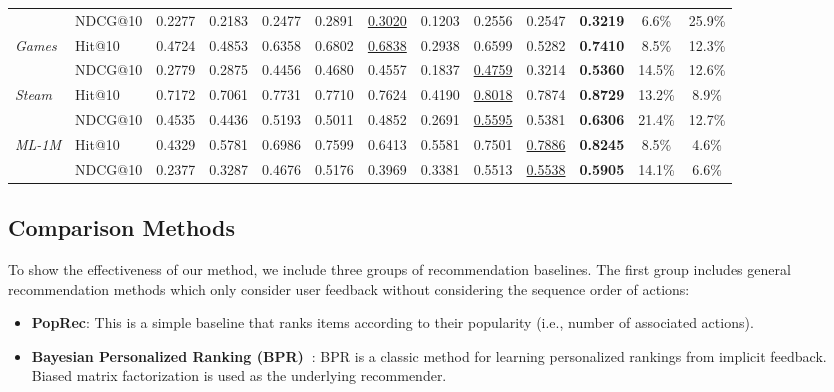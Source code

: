 \documentclass[conference]{IEEEtran}
\begin{document}
\begin{table*}
\begin{tabular}{llccccccccccc}
                                       	& NDCG@10 & 0.2277 & 0.2183 & 0.2477 & 0.2891 & \underline{0.3020} & 0.1203 & 0.2556 & 0.2547 & \textbf{0.3219} & 6.6\% & 25.9\% \\[1.5mm]
\multirow{2}{*}{\emph{Games}}     		& Hit@10  & 0.4724 & 0.4853 & 0.6358 & 0.6802 & \underline{0.6838} & 0.2938 & 0.6599 & 0.5282 & \textbf{0.7410} & 8.5\%	& 12.3\%  \\
                                        & NDCG@10 & 0.2779 & 0.2875 & 0.4456 & 0.4680 & 0.4557 & 0.1837 & \underline{0.4759} & 0.3214 & \textbf{0.5360} & 14.5\% & 12.6\% \\[1.5mm]
\multirow{2}{*}{\emph{Steam}}      		& Hit@10  & 0.7172 & 0.7061 & 0.7731 & 0.7710 & 0.7624 & 0.4190 & \underline{0.8018} & 0.7874 & \textbf{0.8729} & 13.2\% & 8.9\%\\
                                        & NDCG@10 & 0.4535 & 0.4436 & 0.5193 & 0.5011 & 0.4852 & 0.2691 & \underline{0.5595} & 0.5381 & \textbf{0.6306} & 21.4\% & 12.7\% \\[1.5mm]
\multirow{2}{*}{\emph{ML-1M}}    		& Hit@10  & 0.4329 & 0.5781 & 0.6986 & 0.7599 & 0.6413 & 0.5581 & 0.7501 & \underline{0.7886} & \textbf{0.8245} & 8.5\% & 4.6\%\\
                                        & NDCG@10 & 0.2377 & 0.3287 & 0.4676 & 0.5176 & 0.3969 & 0.3381 & 0.5513 & \underline{0.5538} & \textbf{0.5905} & 14.1\%& 6.6\% \\
\bottomrule
\end{tabular}
\end{table*}

\subsection{Comparison Methods}


To show the effectiveness of our method, we include three groups of recommendation 
baselines.
The first group includes general recommendation methods which only consider user feedback without considering the sequence order of actions:
\begin{itemize}
\item \textbf{PopRec}: This is a simple baseline that ranks items according to their popularity (i.e., number of associated actions).

\item \textbf{Bayesian Personalized Ranking (BPR)~\cite{rendle2009bpr}}: BPR is a classic method 
for
learning personalized rankings from implicit feedback. Biased matrix factorization is used as the underlying recommender.

\end{itemize}
\end{document}
